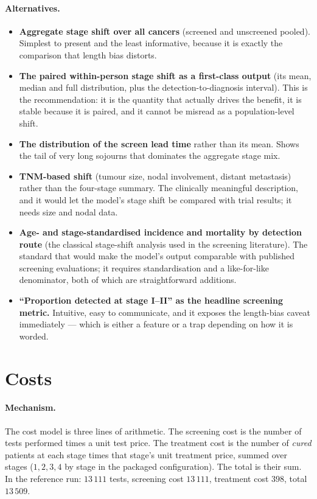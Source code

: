\documentclass[12pt,a4paper]{article}
\newcommand{\mech}[1]{\paragraph{Mechanism.} #1}
\newcommand{\alt}[1]{\paragraph{Alternatives.} #1}
\begin{document}
\alt{\begin{itemize}[nosep]
  \item \textbf{Aggregate stage shift over all cancers} (screened and unscreened pooled). Simplest to
        present and the least informative, because it is exactly the comparison that length bias distorts.
  \item \textbf{The paired within-person stage shift as a first-class output} (its mean, median and full
        distribution, plus the detection-to-diagnosis interval). This is the recommendation: it is the
        quantity that actually drives the benefit, it is stable because it is paired, and it cannot be
        misread as a population-level shift.
  \item \textbf{The distribution of the screen lead time} rather than its mean. Shows the tail of very long
        sojourns that dominates the aggregate stage mix.
  \item \textbf{TNM-based shift} (tumour size, nodal involvement, distant metastasis) rather than the
        four-stage summary. The clinically meaningful description, and it would let the model's stage shift
        be compared with trial results; it needs size and nodal data.
  \item \textbf{Age- and stage-standardised incidence and mortality by detection route} (the classical
        stage-shift analysis used in the screening literature). The standard that would make the model's
        output comparable with published screening evaluations; it requires standardisation and a
        like-for-like denominator, both of which are straightforward additions.
  \item \textbf{``Proportion detected at stage I--II'' as the headline screening metric.} Intuitive, easy to
        communicate, and it exposes the length-bias caveat immediately --- which is either a feature or a
        trap depending on how it is worded.
\end{itemize}}

\section{Costs}

\mech{The cost model is three lines of arithmetic. The screening cost is the number of tests performed
times a unit test price. The treatment cost is the number of \emph{cured} patients at each stage times that
stage's unit treatment price, summed over stages ($1,2,3,4$ by stage in the packaged configuration). The
total is their sum. In the reference run: $13\,111$ tests, screening cost $13\,111$, treatment cost $398$,
total $13\,509$.}
\end{document}
